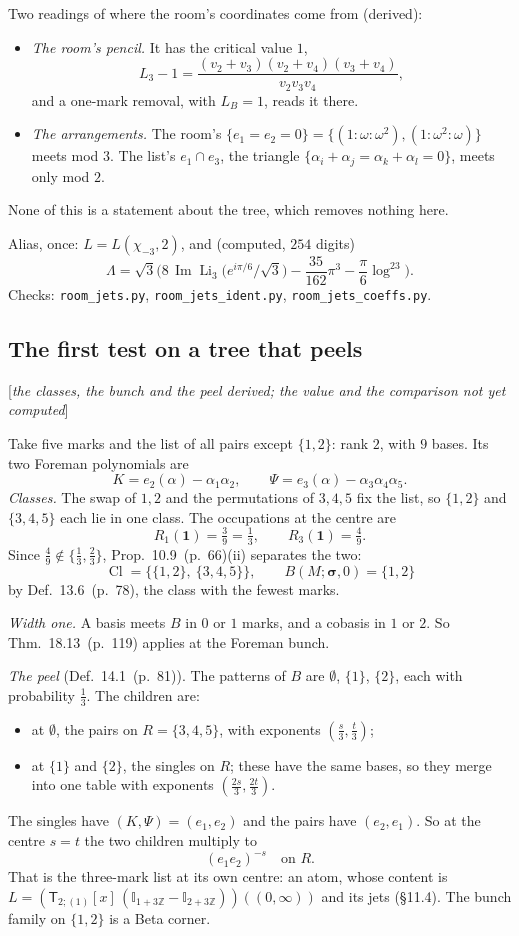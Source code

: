 \documentclass[11pt]{article}
\newcommand{\one}{\mathbf 1}
\newcommand{\sT}{\mathsf T}
\newcommand{\Ilat}[1]{\mathbb I_{#1}}
\newcommand{\Tx}[3]{(\sT_{#1;(1)}[x]\,#2)((#3,\infty))}
\DeclareMathOperator{\im}{Im}
\newcommand{\status}[1]{\hfill{\small[\textit{#1}]}}
\newcommand{\hb}[2]{#1~(p.~#2)}   %
\theoremstyle{plain}
\theoremstyle{remark}
\begin{document}
Two readings of where the room's coordinates come from (derived):
\begin{itemize}
\item \emph{The room's pencil.} It has the critical value $1$,
\[
L_3-1=\frac{(v_2+v_3)(v_2+v_4)(v_3+v_4)}{v_2v_3v_4},
\]
and a one-mark removal, with $L_B=1$, reads it there.
\item \emph{The arrangements.} The room's $\{e_1=e_2=0\}=\{(1:\omega:\omega^2),(1:\omega^2:\omega)\}$ meets mod $3$. The list's $e_1\cap e_3$, the triangle $\{\alpha_i+\alpha_j=\alpha_k+\alpha_l=0\}$, meets only mod $2$.
\end{itemize}
None of this is a statement about the tree, which removes nothing here.

Alias, once: $L=L(\chi_{-3},2)$, and (computed, $254$ digits)
\[
\Lambda=\sqrt3\Big(8\,\im\operatorname{Li}_3\big(e^{i\pi/6}/\sqrt3\big)-\frac{35}{162}\pi^3-\frac{\pi}6\log^23\Big).
\]
Checks: \texttt{room\_jets.py}, \texttt{room\_jets\_ident.py}, \texttt{room\_jets\_coeffs.py}.

\subsection{The first test on a tree that peels}\status{the classes, the bunch and the peel derived; the value and the comparison not yet computed}

Take five marks and the list of all pairs except $\{1,2\}$: rank $2$, with $9$ bases. Its two Foreman polynomials are
\[
K=e_2(\alpha)-\alpha_1\alpha_2,\qquad \Psi=e_3(\alpha)-\alpha_3\alpha_4\alpha_5 .
\]
\emph{Classes.} The swap of $1,2$ and the permutations of $3,4,5$ fix the list, so $\{1,2\}$ and $\{3,4,5\}$ each lie in one class. The occupations at the centre are
\[
R_1(\one)=\tfrac39=\tfrac13,\qquad R_3(\one)=\tfrac49 .
\]
Since $\frac49\notin\{\frac13,\frac23\}$, Prop.~\hb{10.9}{66}(ii) separates the two:
\[
\operatorname{Cl}=\big\{\{1,2\},\ \{3,4,5\}\big\},\qquad B(M;\boldsymbol\sigma,0)=\{1,2\}
\]
by Def.~\hb{13.6}{78}, the class with the fewest marks.

\emph{Width one.} A basis meets $B$ in $0$ or $1$ marks, and a cobasis in $1$ or $2$. So Thm.~\hb{18.13}{119} applies at the Foreman bunch.

\emph{The peel} (Def.~\hb{14.1}{81}). The patterns of $B$ are $\emptyset$, $\{1\}$, $\{2\}$, each with probability $\frac13$. The children are:
\begin{itemize}
\item at $\emptyset$, the pairs on $R=\{3,4,5\}$, with exponents $(\frac s3,\frac t3)$;
\item at $\{1\}$ and $\{2\}$, the singles on $R$; these have the same bases, so they merge into one table with exponents $(\frac{2s}3,\frac{2t}3)$.
\end{itemize}
The singles have $(K,\Psi)=(e_1,e_2)$ and the pairs have $(e_2,e_1)$. So at the centre $s=t$ the two children multiply to
\[
(e_1e_2)^{-s}\quad\text{on }R .
\]
That is the three-mark list at its own centre: an atom, whose content is $L=\Tx{2}{(\Ilat{1+3\mathbb Z}-\Ilat{2+3\mathbb Z})}{0}$ and its jets (\S11.4). The bunch family on $\{1,2\}$ is a Beta corner.
\end{document}
